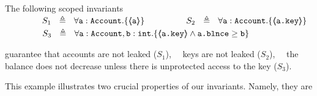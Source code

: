\begin{example}
\label{s:bankSpecEx}
The following scoped invariants\\
$\strut \SPSP\ \ \   S_1\ \  \triangleq \ \ \TwoStatesN {\prg{a}:\prg{Account}}  {\inside{\prg{a}}} $ 
\hspace{1.1cm}
$\strut  \SPSP\ \ \   S_2\ \  \triangleq \ \ \TwoStatesN  {\prg{a}:\prg{Account}}  {\inside{\prg{a.key}}} $ 
\\
$\strut  \SPSP\ \ \   S_3\ \  \triangleq \ \ \TwoStatesN{ \prg{a}:\prg{Account},\prg{b}:\prg{int} } {\inside{\prg{a.key}} \wedge \prg{a.\balance} \geq \prg{b} } $ 

\noindent
 guarantee that   accounts are not leaked  ($S_1$), \ \ keys are not leaked  ($S_2$), \ \ the balance does not decrease unless there is unprotected access to the key  ($S_3$).
%
\end{example} 
 \vspace{.005cm}

 
\noindent
This example illustrates two crucial properties of our   invariants. Namely, they are

